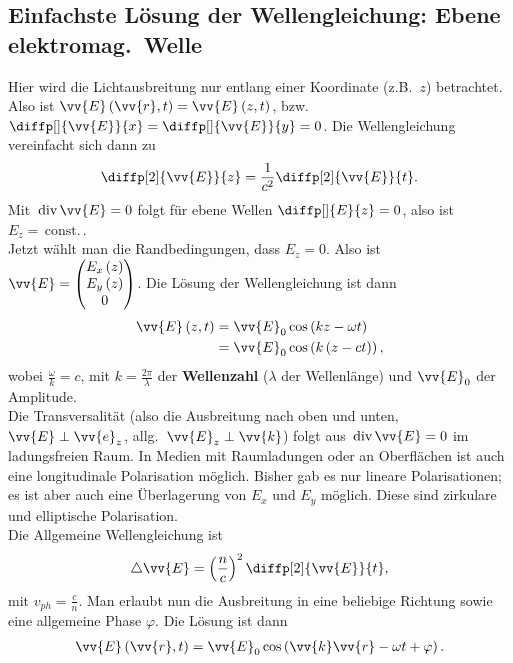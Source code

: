 \documentclass[a4paper,12pt]{article}
\numberwithin{equation}{section}
\begin{document}
\subsection{Einfachste Lösung der Wellengleichung: Ebene elektromag.\ Welle}
Hier wird die Lichtausbreitung nur entlang einer Koordinate (z.B.\ $z$) betrachtet. Also ist $\vv{E}\left(\vv{r},t\right)=\vv{E}\left(z,t\right)$, bzw.\ $\diffp[]{\vv{E}}{x}=\diffp[]{\vv{E}}{y}=0$. Die Wellengleichung vereinfacht sich dann zu
\begin{align} 
        \diffp[2]{\vv{E}}{z}=\dfrac{1}{c^2}\diffp[2]{\vv{E}}{t}
.\end{align} 
Mit $\,\text{div}\,\vv{E}=0$ folgt für ebene Wellen $\diffp[]{E}{z}=0$, also ist $E_z=\,\text{const.}\,$.\\\indent
Jetzt wählt man die Randbedingungen, dass $E_z=0$. Also ist $\vv{E}=\begin{pmatrix}
        E_x\left(z\right)\\E_y\left(z\right)\\0
\end{pmatrix}$. Die Lösung der Wellengleichung ist dann
\begin{align} 
        \vv{E}\left(z,t\right)&=\vv{E}_0\cos \left(kz-\omega t\right)\\
                              &=\vv{E}_0\cos \left(k\left(z-ct\right)\right)
,\end{align} 
wobei $\tfrac{\omega }{k}=c$, mit $k=\tfrac{2\pi }{\lambda }$ der \textbf{Wellenzahl} ($\lambda $ der Wellenlänge) und $\vv{E}_0$ der Amplitude.\\\indent
Die Transversalität (also die Ausbreitung nach oben und unten, $\vv{E}\perp \vv{e}_z$, allg.\ $\vv{E}_z\perp \vv{k}$) folgt aus $\,\text{div}\,\vv{E}=0$ im ladungsfreien Raum. In Medien mit Raumladungen oder an Oberflächen ist auch eine longitudinale Polarisation möglich. Bisher gab es nur lineare Polarisationen; es ist aber auch eine Überlagerung von $E_x$ und $E_y$ möglich. Diese sind zirkulare und elliptische Polarisation.\\\indent
Die Allgemeine Wellengleichung ist
\begin{align} 
        \triangle \vv{E}=\left(\dfrac{n}{c}\right)^2\diffp[2]{\vv{E}}{t}
,\end{align} 
mit $v_{ph}=\tfrac{c}{n}$. Man erlaubt nun die Ausbreitung in eine beliebige Richtung sowie eine allgemeine Phase $\varphi $. Die Lösung ist dann
\begin{align} 
        \vv{E}\left(\vv{r},t\right)=\vv{E}_0\cos \left(\vv{k}\vv{r}-\omega t+\varphi \right)
.\end{align} 
\end{document}
